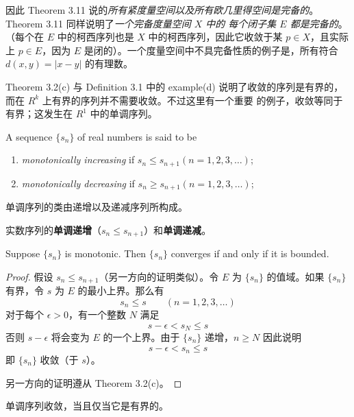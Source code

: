 \documentclass[../poma-notes.tex]{subfiles}
\begin{document}
因此 Theorem 3.11 说的\textit{所有紧度量空间以及所有欧几里得空间是完备的}。Theorem 3.11 同样说明了\textit{一个完备度量空间 $X$ 中的
  每个闭子集 $E$ 都是完备的}。（每个在 $E$ 中的柯西序列也是 $X$ 中的柯西序列，因此它收敛于某 $p \in X$，且实际上 $p \in E$，因为 $E$
是闭的）。一个度量空间中不具完备性质的例子是，所有符合 $d(x,y) = |x - y|$ 的有理数。

Theorem 3.2(c) 与 Definition 3.1 中的 example(d) 说明了收敛的序列是有界的，而在 $R^k$ 上有界的序列并不需要收敛。不过这里有一个重要
的例子，收敛等同于有界；这发生在 $R^1$ 中的单调序列。

\begin{definition}
  A sequence $\{s_n\}$ of real numbers is said to be
  \begin{enumerate}[label=(\alph*)]
    \item \textit{monotonically increasing} if $s_n \le s_{n+1} (n=1,2,3,\dots)$;
    \item \textit{monotonically decreasing} if $s_n \ge s_{n+1} (n=1,2,3,\dots)$;
  \end{enumerate}
\end{definition}

单调序列的类由递增以及递减序列所构成。

\anote 实数序列的\textbf{单调递增}（$s_n \le s_{n+1}$）和\textbf{单调递减}。

\begin{theorem}
  Suppose $\{s_n\}$ is monotonic. Then $\{s_n\}$ converges if and only if it is bounded.
\end{theorem}

\begin{proof}
  假设 $s_n \le s_{n+1}$（另一方向的证明类似）。令 $E$ 为 $\{s_n\}$ 的值域。如果 $\{s_n\}$ 有界，令 $s$ 为 $E$ 的最小上界。那么有
  \[ s_n \le s \qquad (n=1,2,3,\dots) \]
  对于每个 $\epsilon > 0$，有一个整数 $N$ 满足
  \[ s - \epsilon < s_N \le s \]
  否则 $s - \epsilon$ 将会变为 $E$ 的一个上界。由于 $\{s_n\}$ 递增，$n \ge N$ 因此说明
  \[ s - \epsilon < s_n \le s \]
  即 $\{s_n\}$ 收敛（于 $s$）。

  另一方向的证明遵从 Theorem 3.2(c)。
\end{proof}

\anote 单调序列收敛，当且仅当它是有界的。
\end{document}

